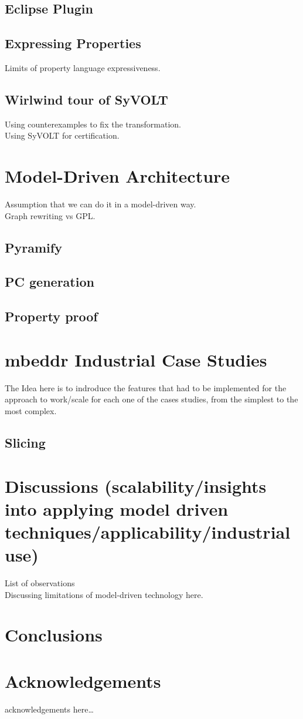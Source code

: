 \documentclass[conference]{IEEEtran}
\begin{document}
\subsection{Eclipse Plugin}
\subsection{Expressing Properties}
Limits of property language expressiveness.
\subsection{Wirlwind tour of SyVOLT}
Using counterexamples to fix the transformation.\\
Using SyVOLT for certification.
\section{Model-Driven Architecture}
Assumption that we can do it in a model-driven way.\\
Graph rewriting vs GPL.
\subsection{Pyramify}
\subsection{PC generation}
\subsection{Property proof}
\section{mbeddr Industrial Case Studies}
The Idea here is to indroduce the features that had to be implemented for the
approach to work/scale for each one of the cases studies, from the simplest to
the most complex.
\subsection{Slicing}
\section{Discussions (scalability/insights into
applying model driven techniques/applicability/industrial use)}
List of observations\\
Discussing limitations of model-driven technology here.

\section{Conclusions}

\section*{Acknowledgements}
acknowledgements here\ldots



\end{document}
